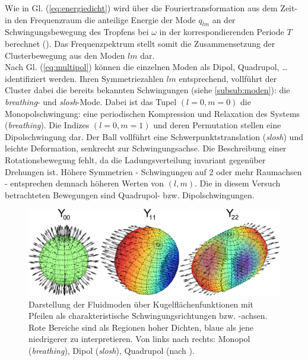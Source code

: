 \documentclass[numbers=noenddot,a4paper]{scrartcl}
\newcommand{\tilt}[1]{\textit{#1}}
\begin{document}
					Wie in Gl. (\ref{eq:energiedicht}) wird \"uber die Fouriertransformation aus dem Zeit- in den Frequenzraum die anteilige Energie der Mode $q_{lm}$ an der Schwingungsbewegung des Tropfens bei $\omega$ in der korrespondierenden Periode  $T$ berechnet (\cite{Schella13}). Das Frequenzpektrum stellt somit die Zusammensetzung der Clusterbewegung aus den Moden $lm$ dar.\\
					Nach Gl. (\ref{eq:multipol}) k\"onnen die einzelnen Moden als Dipol, Quadrupol, \dots identifiziert werden. Ihren Symmetriezahlen $lm$ entsprechend, vollf\"uhrt der Cluster dabei die bereits bekannten Schwingungen (siehe \ref{subsub:moden}): die \tilt{breathing}- und \tilt{slosh}-Mode. Dabei ist das Tupel $\left(l=0,m=0\right)$ die Monopolschwingung: eine periodischen Kompression und Relaxation des Systems (\tilt{breathing}). Die Indizes $\left(l=0,m=1\right)$ und deren Permutation stellen eine Dipolschwingung dar. Der Ball vollf\"uhrt eine Schwerpunktstranslation (\tilt{slosh}) und leichte Deformation, senkrecht zur Schwingungsachse. Die Beschreibung einer Rotationsbewegung fehlt, da die Ladungsverteilung invariant gegen\"uber Drehungen ist. H\"ohere Symmetrien - Schwingungen auf 2 oder mehr Raumachsen - entsprechen demnach h\"oheren Werten von $\left(l,m\right)$. Die in diesem Versuch betrachteten Bewegungen sind Quadrupol- bzw. Dipolschwingungen.

						\begin{figure}[H]
                            \centering
                            \includegraphics[width=\textwidth,height=0.375\textwidth]{figs/y001122.png}
                            \caption{Darstellung der Fluidmoden über Kugelflächenfunktionen mit Pfeilen als charakteristische Schwingungsrichtungen bzw. -achsen. Rote Bereiche sind als Regionen hoher Dichten, blaue als jene niedrigerer zu interpretieren. Von links nach rechts: Monopol (\tilt{breathing}), Dipol (\tilt{slosh}), Quadrupol (nach \cite{Mulsow13}).}
                            \label{img:fluidmode}
                        \end{figure}
\end{document}
